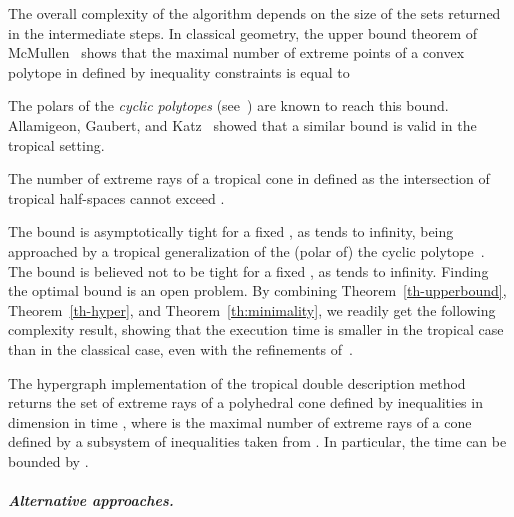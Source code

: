 \documentclass[proceedings]{stacs}
\begin{document}
The overall complexity of the algorithm  depends on the size of the sets returned in the intermediate steps. In classical geometry, the upper bound theorem of McMullen~\cite{mcmullen70} shows that the maximal number of extreme points of a convex polytope in  defined by  inequality constraints is equal to 
 
The polars of the \emph{cyclic polytopes} (see~\cite{ziegler98}) are known to reach this bound. Allamigeon, Gaubert, and Katz~\cite{AGK09} showed that a similar bound is valid in the tropical setting.
\begin{theorem}\label{th-upperbound}
The number of extreme rays of a tropical cone in 
defined as the intersection of  tropical half-spaces cannot exceed . 
\end{theorem}
The bound is asymptotically tight for a fixed ,
as  tends to infinity, being approached by a tropical generalization of the
(polar of) the cyclic polytope~\cite{AGK09}. The bound is believed not to be tight for a fixed , 
as  tends to infinity.
Finding the optimal bound is an open problem. 
By combining Theorem~\ref{th-upperbound}, Theorem~\ref{th-hyper}, and Theorem~\ref{th:minimality}, we readily get the following complexity result,
showing that the execution time is smaller in the tropical case
than in the classical case, even with the refinements of~\cite{FukudaProdon96}.
\begin{proposition}\label{wc}
The hypergraph implementation of the tropical double description method
returns the set of extreme rays
of a polyhedral cone defined by  inequalities in dimension 
in time , where  is the
maximal number of extreme rays of a cone defined by a subsystem of inequalities
taken from . 
In particular, the time can be bounded by .
\end{proposition}








\paragraph{\textit{Alternative approaches.}}
\end{document}
